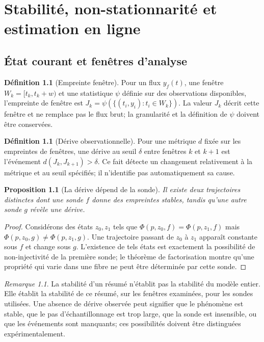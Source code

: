 \documentclass[11pt,oneside]{book}
\newtheorem{proposition}[theoreme]{Proposition}
\theoremstyle{definition}
\newtheorem{definition}[theoreme]{Définition}
\theoremstyle{remark}
\newtheorem{remarque}[theoreme]{Remarque}
\newcommand{\1}{\mathbf 1}
\begin{document}
\chapter{Stabilité, non-stationnarité et estimation en ligne}
\section{État courant et fenêtres d'analyse}
\begin{definition}[Empreinte fenêtre]
Pour un flux $y_f(t)$, une fenêtre $W_k=[t_k,t_k+w)$ et une statistique $\psi$ définie sur des observations disponibles, l'empreinte de fenêtre est $J_k=\psi(\{(t_i,y_i):t_i\in W_k\})$. La valeur $J_k$ décrit cette fenêtre et ne remplace pas le flux brut; la granularité et la définition de $\psi$ doivent être conservées.
\end{definition}

\begin{definition}[Dérive observationnelle]
Pour une métrique $d$ fixée sur les empreintes de fenêtres, une dérive au seuil $\delta$ entre fenêtres $k$ et $k+1$ est l'événement $d(J_k,J_{k+1})>\delta$. Ce fait détecte un changement relativement à la métrique et au seuil spécifiés; il n'identifie pas automatiquement sa cause.
\end{definition}

\begin{proposition}[La dérive dépend de la sonde]
Il existe deux trajectoires distinctes dont une sonde $f$ donne des empreintes stables, tandis qu'une autre sonde $g$ révèle une dérive.
\end{proposition}
\begin{proof}
Considérons des états $z_0,z_1$ tels que $\Phi(p,z_0,f)=\Phi(p,z_1,f)$ mais $\Phi(p,z_0,g)\neq\Phi(p,z_1,g)$. Une trajectoire passant de $z_0$ à $z_1$ apparaît constante sous $f$ et change sous $g$. L'existence de tels états est exactement la possibilité de non-injectivité de la première sonde; le théorème de factorisation montre qu'une propriété qui varie dans une fibre ne peut être déterminée par cette sonde.
\end{proof}

\begin{remarque}
La stabilité d'un résumé n'établit pas la stabilité du modèle entier. Elle établit la stabilité de ce résumé, sur les fenêtres examinées, pour les sondes utilisées. Une absence de dérive observée peut signifier que le phénomène est stable, que le pas d'échantillonnage est trop large, que la sonde est insensible, ou que les événements sont manquants; ces possibilités doivent être distinguées expérimentalement.
\end{remarque}
\end{document}
